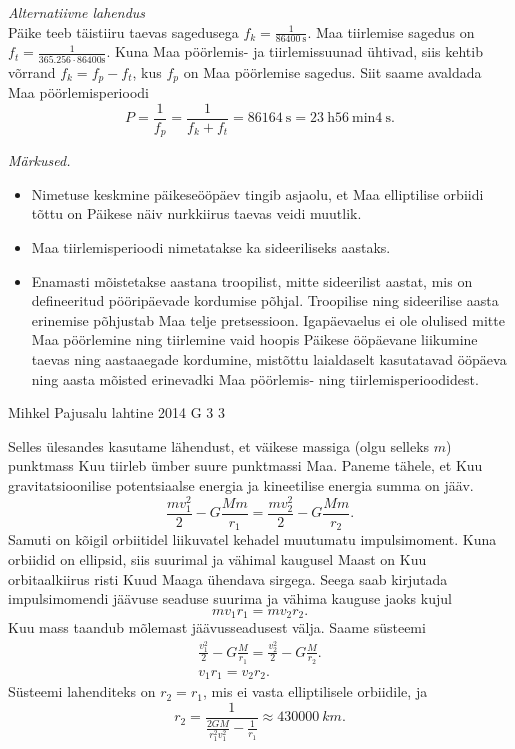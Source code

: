 \documentclass[11pt, twoside]{article}
\begin{document}
{{\vspace{0.5\baselineskip}
\emph{Alternatiivne lahendus}\\
Päike teeb täistiiru taevas sagedusega $f_k=\frac{1}{\SI{86400}{\second}}$. Maa tiirlemise sagedus on $f_t=\frac{1}{\num{365,256}\cdot86400\text{s}}$. Kuna Maa pöörlemis- ja tiirlemissuunad ühtivad, siis kehtib võrrand $f_k=f_p-f_t$, kus $f_p$ on Maa pöörlemise sagedus. Siit saame avaldada Maa pöörlemisperioodi 
\[
P=\frac{1}{f_p}=\frac{1}{f_k+f_t}=\SI{86164}{\second}=\SI{23}{\hour} \SI{56}{\minute} \SI{4}{\second}.
\]

\emph{Märkused.}

\vspace{-5pt}
\begin{itemize}[noitemsep, leftmargin=*]
\item Nimetuse keskmine päikeseööpäev tingib asjaolu, et Maa elliptilise orbiidi tõttu on Päikese näiv nurkkiirus taevas veidi muutlik.
\item Maa tiirlemisperioodi nimetatakse ka sideeriliseks aastaks. 
\item Enamasti mõistetakse aastana troopilist, mitte sideerilist aastat, mis on defineeritud pööripäevade kordumise põhjal. Troopilise ning sideerilise aasta erinemise põhjustab Maa telje pretsessioon. Igapäevaelus ei ole olulised mitte Maa pöörlemine ning tiirlemine vaid hoopis Päikese ööpäevane liikumine taevas ning aastaaegade kordumine, mistõttu laialdaselt kasutatavad ööpäeva ning aasta mõisted erinevadki Maa pöörlemis- ning tiirlemisperioodidest. 
\end{itemize}
\fi
}

{Mihkel Pajusalu} %
{lahtine} %
{2014} %
{G 3} %
{3} %
{

\ifSolution
Selles ülesandes kasutame lähendust, et väikese massiga (olgu selleks $m$) punktmass Kuu tiirleb ümber suure punktmassi Maa. Paneme tähele, et Kuu gravitatsioonilise potentsiaalse energia ja kineetilise energia summa on jääv.
$$
\frac{mv_1^2}{2}-G\frac{Mm}{r_1}=\frac{mv_2^2}{2}-G\frac{Mm}{r_2}.
$$
Samuti on kõigil orbiitidel liikuvatel kehadel muutumatu impulsimoment. Kuna orbiidid on ellipsid, siis suurimal ja vähimal kaugusel Maast on Kuu orbitaalkiirus risti Kuud Maaga ühendava sirgega. Seega saab kirjutada impulsimomendi jäävuse seaduse suurima ja vähima kauguse jaoks kujul
$$
mv_1r_1=mv_2r_2.
$$
Kuu mass taandub mõlemast jäävusseadusest välja. Saame süsteemi
$$
\begin{array}{c} 
\frac{v_1^2}{2}-G\frac{M}{r_1}=\frac{v_2^2}{2}-G\frac{M}{r_2}.\\
v_1r_1=v_2r_2.
\end{array}
$$
Süsteemi lahenditeks on $r_2=r_1$, mis ei vasta elliptilisele orbiidile, ja $$r_2=\frac{1}{\frac{2GM}{r_1^2v_1^2}-\frac{1}{r_1}}\approx\SI{430000}{km}.$$
\fi
}

}
\end{document}
